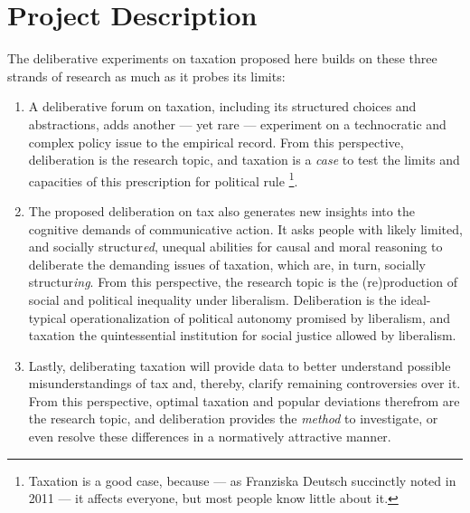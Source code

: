 \section{Project Description}



The deliberative experiments on taxation proposed here builds on these three strands of research as much as it probes its limits:

\begin{enumerate}
\item 
	A deliberative forum on taxation, including its structured choices and abstractions, adds another --- yet rare --- experiment on a technocratic and complex policy issue to the empirical record.
	From this perspective, deliberation is the research topic, and taxation is a \emph{case} to test the limits and capacities of this prescription for political {rule}
	\footnote{
		Taxation is a good case, because --- as Franziska Deutsch succinctly noted in 2011 --- it affects everyone, but most people know little about it.
	}.
	
\item The proposed deliberation on tax also generates new insights into the cognitive demands of communicative action.
	It asks people with likely limited, and socially structur\emph{ed}, unequal abilities for causal and moral reasoning to deliberate the demanding issues of taxation, which are, in turn, socially structur\emph{ing}.
	From this perspective, the research topic is the (re)production of social and political inequality under liberalism.
	Deliberation is the ideal-typical operationalization of political autonomy promised by liberalism, and taxation the quintessential institution for social justice allowed by liberalism. %
	
\item Lastly, deliberating taxation will provide data to better understand possible misunderstandings of tax and, thereby, clarify remaining controversies over it.
	From this perspective, optimal taxation and popular deviations therefrom are the research topic, and deliberation provides the \emph{method} to investigate, or even resolve these differences in a normatively attractive \citep{Rawls-1971,Habermas1984} manner.
\end{enumerate}

